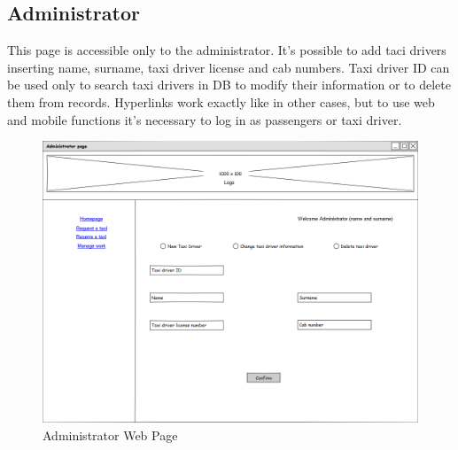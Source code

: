 \subsection{Administrator}
This page is accessible only to the administrator. It's possible to add taci drivers inserting name, surname, taxi driver license and cab numbers. Taxi driver ID can be used only to search taxi drivers in DB to modify their information or to delete them from records. \newline Hyperlinks work exactly like in other cases, but to use web and mobile functions it's necessary to log in as passengers or taxi driver.
\begin{figure}[H]
\centering
\includegraphics[scale=0.35]{mockups/administrator.png}
\caption{Administrator Web Page}
\end{figure}
